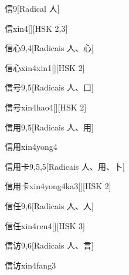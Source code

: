 \begin{entry}{信}{9}[Radical ⼈]
  \begin{phonetics}{信}{xin4}[][HSK 2,3]
  \end{phonetics}
\end{entry}

\begin{entry}{信心}{9,4}[Radicais ⼈、⼼]
  \begin{phonetics}{信心}{xin4xin1}[][HSK 2]
  \end{phonetics}
\end{entry}

\begin{entry}{信号}{9,5}[Radicais ⼈、⼝]
  \begin{phonetics}{信号}{xin4hao4}[][HSK 2]
  \end{phonetics}
\end{entry}

\begin{entry}{信用}{9,5}[Radicais ⼈、⽤]
  \begin{phonetics}{信用}{xin4yong4}
  \end{phonetics}
\end{entry}

\begin{entry}{信用卡}{9,5,5}[Radicais ⼈、⽤、⼘]
  \begin{phonetics}{信用卡}{xin4yong4ka3}[][HSK 2]
  \end{phonetics}
\end{entry}

\begin{entry}{信任}{9,6}[Radicais ⼈、⼈]
  \begin{phonetics}{信任}{xin4ren4}[][HSK 3]
  \end{phonetics}
\end{entry}

\begin{entry}{信访}{9,6}[Radicais ⼈、⾔]
  \begin{phonetics}{信访}{xin4fang3}
  \end{phonetics}
\end{entry}

